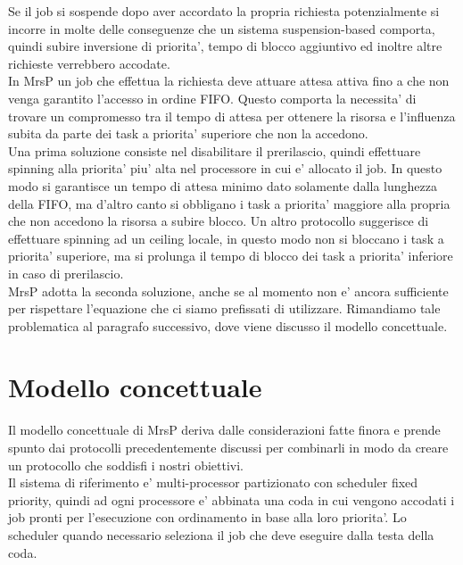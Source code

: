 \documentclass[a4paper,11pt]{article}
\begin{document}
\noindent Se il job si sospende dopo aver accordato la propria richiesta potenzialmente si incorre in molte delle conseguenze che un sistema suspension-based comporta, quindi subire inversione di priorita', tempo di blocco aggiuntivo ed inoltre altre richieste verrebbero accodate.\\

\noindent In MrsP un job che effettua la richiesta deve attuare attesa attiva fino a che non venga garantito l'accesso in ordine FIFO. Questo comporta la necessita' di trovare un compromesso tra il tempo di attesa per ottenere la risorsa e l'influenza subita da parte dei task a priorita' superiore che non la accedono. \\

\noindent Una prima soluzione consiste nel disabilitare il prerilascio, quindi effettuare spinning alla priorita' piu' alta nel processore in cui e' allocato il job. In questo modo si garantisce un tempo di attesa minimo dato solamente dalla lunghezza della FIFO, ma d'altro canto si obbligano i task a priorita' maggiore alla propria che non accedono la risorsa a subire blocco. Un altro protocollo suggerisce di effettuare spinning ad un ceiling locale, in questo modo non si bloccano i task a priorita' superiore, ma si prolunga il tempo di blocco dei task a priorita' inferiore in caso di prerilascio.\\

\noindent MrsP adotta la seconda soluzione, anche se al momento non e' ancora sufficiente per rispettare l'equazione che ci siamo prefissati di utilizzare. Rimandiamo tale problematica al paragrafo successivo, dove viene discusso il modello concettuale.\\

\section{Modello concettuale}

\noindent Il modello concettuale di MrsP deriva dalle considerazioni fatte finora e prende spunto dai protocolli precedentemente discussi per combinarli in modo da creare un protocollo che soddisfi i nostri obiettivi.\\

\noindent Il sistema di riferimento e' multi-processor partizionato con scheduler fixed priority, quindi ad ogni processore e' abbinata una coda in cui vengono accodati i job pronti per l'esecuzione con ordinamento in base alla loro priorita'. Lo scheduler quando necessario seleziona il job che deve eseguire dalla testa della coda.\\
\end{document}
